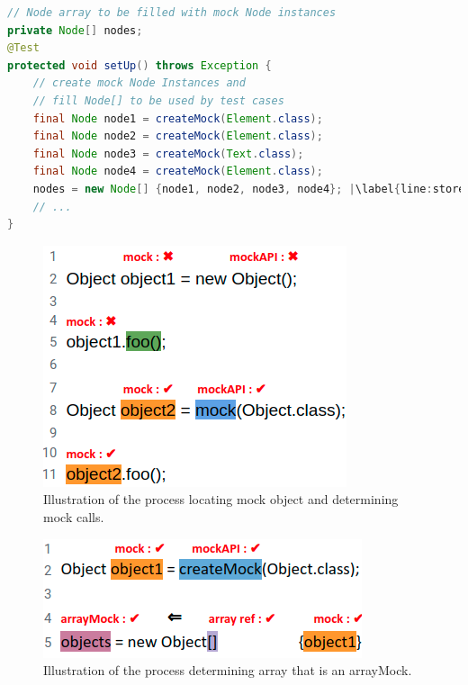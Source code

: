 \begin{lstlisting}[basicstyle=\ttfamily, caption={This example illustrates a field array container holding mock objects from \textit{setup()} in \texttt{NodeListIteratorTest.java}.},
basicstyle=\scriptsize\ttfamily,language = Java, framesep=4.5mm, framexleftmargin=1.0mm, captionpos=b, xleftmargin=3.5ex, label=lis:container, escapechar=|]
// Node array to be filled with mock Node instances
private Node[] nodes;
@Test
protected void setUp() throws Exception {
    // create mock Node Instances and 
    // fill Node[] to be used by test cases
    final Node node1 = createMock(Element.class);
    final Node node2 = createMock(Element.class);
    final Node node3 = createMock(Text.class);
    final Node node4 = createMock(Element.class);
    nodes = new Node[] {node1, node2, node3, node4}; |\label{line:storeMocksInArray}|
    // ...
}
\end{lstlisting}


\begin{figure}
    \includegraphics[width=.25\textwidth]{Images/mockInvocationIllustration.png}
    
    \caption{Illustration of the process locating mock object and determining mock calls.}
    \label{fig:mockMethodIllustration}
    
\end{figure}

\begin{figure}
    \includegraphics[width=.25\textwidth]{Images/arrayMockIllustration.png}
    
    \caption{Illustration of the process determining array that is an arrayMock.}
    \label{fig:arrayMockIllustration}
    
\end{figure}

\begin{lstlisting}[basicstyle=\ttfamily, caption={Jimple Intermediate Representation for the sample code in Figure~\ref{fig:mockMethodIllustration}.},
basicstyle=\scriptsize\ttfamily, framesep=4.5mm, framexleftmargin=1.0mm, captionpos=b, xleftmargin=3.5ex, label=lis:mockMethodIllustrationIR, escapechar=|]

\end{lstlisting}

